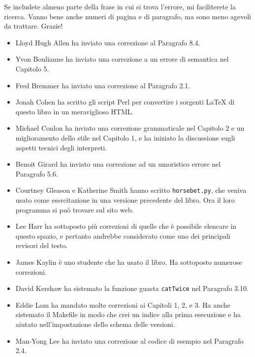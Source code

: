\documentclass[10pt]{book}
\begin{document}
Se includete almeno parte della frase in cui si trova l'errore, mi faciliterete la ricerca. Vanno bene anche numeri di pagina e di paragrafo, ma sono meno agevoli da trattare. Grazie!

\begin{itemize}

\small
\item Lloyd Hugh Allen ha inviato una correzione al Paragrafo 8.4.

\item Yvon Boulianne ha inviato una correzione a un errore di semantica nel Capitolo 5.

\item Fred Bremmer ha inviato una correzione al Paragrafo 2.1.

\item Jonah Cohen ha scritto gli script Perl per convertire i sorgenti
LaTeX di questo libro in un meraviglioso HTML.

\item Michael Conlon ha inviato una correzione grammaticale nel Capitolo 2
e un miglioramento dello stile nel Capitolo 1, e ha iniziato la discussione sugli aspetti tecnici degli interpreti.

\item Benoit Girard ha inviato una correzione ad un umoristico errore nel Paragrafo 5.6.

\item Courtney Gleason e Katherine Smith hanno scritto {\tt horsebet.py},
che veniva usato come esercitazione in una versione precedente del libro. Ora il loro programma si può trovare sul sito web.

\item Lee Harr ha sottoposto più correzioni di quelle che è possibile elencare in questo spazio, e pertanto andrebbe considerato come uno dei principali revisori del testo.

\item James Kaylin è uno studente che ha usato il libro. Ha sottoposto numerose correzioni.

\item David Kershaw ha sistemato la funzione guasta {\tt catTwice} nel Paragrafo
3.10.

\item Eddie Lam ha mandato molte correzioni ai Capitoli 1, 2, e 3.
Ha anche sistemato il Makefile in modo che crei un indice alla prima esecuzione e ha aiutato nell'impostazione dello schema delle versioni.  

\item Man-Yong Lee ha inviato una correzione al codice di esempio nel Paragrafo 2.4.  


\end{itemize}
\end{document}
